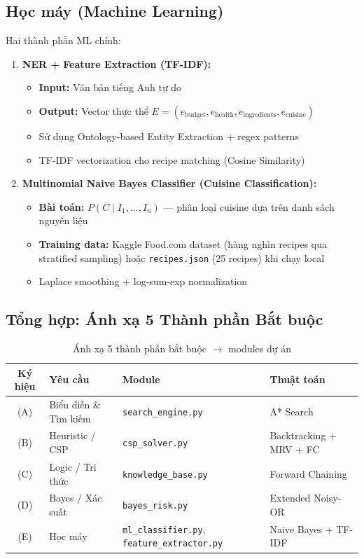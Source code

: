 \subsection{Học máy (Machine Learning)}

Hai thành phần ML chính:

\begin{enumerate}
  \item \textbf{NER + Feature Extraction (TF-IDF):}
    \begin{itemize}
      \item \textbf{Input:} Văn bản tiếng Anh tự do
      \item \textbf{Output:} Vector thực thể $E = (e_{\text{budget}}, e_{\text{health}}, e_{\text{ingredients}}, e_{\text{cuisine}})$
      \item Sử dụng Ontology-based Entity Extraction + regex patterns
      \item TF-IDF vectorization cho recipe matching (Cosine Similarity)
    \end{itemize}

  \item \textbf{Multinomial Naive Bayes Classifier (Cuisine Classification):}
    \begin{itemize}
      \item \textbf{Bài toán:} $P(C \mid I_1, \ldots, I_n)$ --- phân loại cuisine dựa trên danh sách nguyên liệu
      \item \textbf{Training data:} Kaggle Food.com dataset (hàng nghìn recipes qua stratified sampling) hoặc \texttt{recipes.json} (25 recipes) khi chạy local
      \item Laplace smoothing + log-sum-exp normalization
    \end{itemize}
\end{enumerate}

\subsection{Tổng hợp: Ánh xạ 5 Thành phần Bắt buộc}

\begin{table}[H]
\centering
\begin{tabular}{|c|l|l|l|}
\hline
\textbf{Ký hiệu} & \textbf{Yêu cầu} & \textbf{Module} & \textbf{Thuật toán} \\
\hline
(A) & Biểu diễn \& Tìm kiếm & \texttt{search\_engine.py} & A* Search \\
\hline
(B) & Heuristic / CSP & \texttt{csp\_solver.py} & Backtracking + MRV + FC \\
\hline
(C) & Logic / Tri thức & \texttt{knowledge\_base.py} & Forward Chaining \\
\hline
(D) & Bayes / Xác suất & \texttt{bayes\_risk.py} & Extended Noisy-OR \\
\hline
(E) & Học máy & \texttt{ml\_classifier.py}, \texttt{feature\_extractor.py} & Naive Bayes + TF-IDF \\
\hline
\end{tabular}
\caption{Ánh xạ 5 thành phần bắt buộc $\to$ modules dự án}
\label{tab:5pillars}
\end{table}
